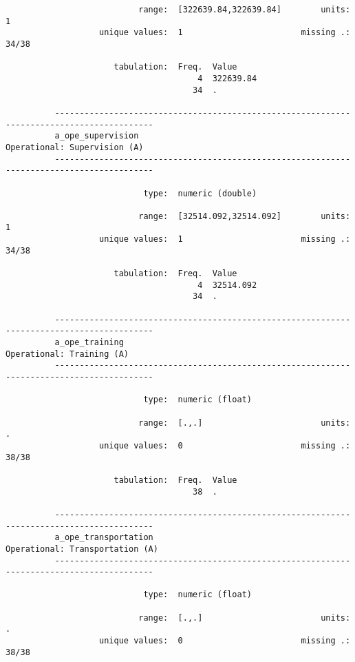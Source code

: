 \documentclass{article}
\begin{document}
\begin{verbatim}
                           range:  [322639.84,322639.84]        units:  1
                   unique values:  1                        missing .:  34/38
          
                      tabulation:  Freq.  Value
                                       4  322639.84
                                      34  .
          
          ------------------------------------------------------------------------------------------
          a_ope_supervision                                             Operational: Supervision (A)
          ------------------------------------------------------------------------------------------
          
                            type:  numeric (double)
          
                           range:  [32514.092,32514.092]        units:  1
                   unique values:  1                        missing .:  34/38
          
                      tabulation:  Freq.  Value
                                       4  32514.092
                                      34  .
          
          ------------------------------------------------------------------------------------------
          a_ope_training                                                   Operational: Training (A)
          ------------------------------------------------------------------------------------------
          
                            type:  numeric (float)
          
                           range:  [.,.]                        units:  .
                   unique values:  0                        missing .:  38/38
          
                      tabulation:  Freq.  Value
                                      38  .
          
          ------------------------------------------------------------------------------------------
          a_ope_transportation                                       Operational: Transportation (A)
          ------------------------------------------------------------------------------------------
          
                            type:  numeric (float)
          
                           range:  [.,.]                        units:  .
                   unique values:  0                        missing .:  38/38
          

\end{verbatim}
\end{document}
